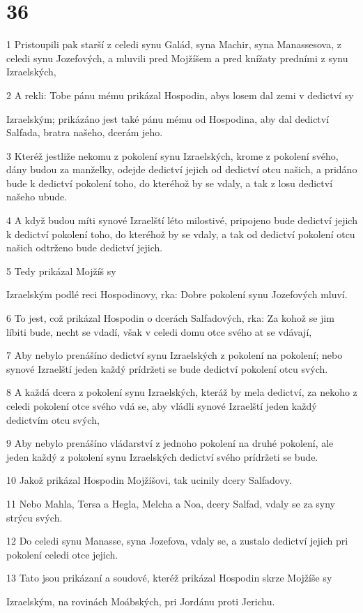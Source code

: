 \chapter{36}

\par 1 Pristoupili pak starší z celedi synu Galád, syna Machir, syna Manassesova, z celedi synu Jozefových, a mluvili pred Mojžíšem a pred knížaty predními z synu Izraelských,
\par 2 A rekli: Tobe pánu mému prikázal Hospodin, abys losem dal zemi v dedictví sy\par Izraelským; prikázáno jest také pánu mému od Hospodina, aby dal dedictví Salfada, bratra našeho, dcerám jeho.
\par 3 Kteréž jestliže nekomu z pokolení synu Izraelských, krome z pokolení svého, dány budou za manželky, odejde dedictví jejich od dedictví otcu našich, a pridáno bude k dedictví pokolení toho, do kteréhož by se vdaly, a tak z losu dedictví našeho ubude.
\par 4 A když budou míti synové Izraelští léto milostivé, pripojeno bude dedictví jejich k dedictví pokolení toho, do kteréhož by se vdaly, a tak od dedictví pokolení otcu našich odtrženo bude dedictví jejich.
\par 5 Tedy prikázal Mojžíš sy\par Izraelským podlé reci Hospodinovy, rka: Dobre pokolení synu Jozefových mluví.
\par 6 To jest, což prikázal Hospodin o dcerách Salfadových, rka: Za kohož se jim líbiti bude, necht se vdadí, však v celedi domu otce svého at se vdávají,
\par 7 Aby nebylo prenášíno dedictví synu Izraelských z pokolení na pokolení; nebo synové Izraelští jeden každý prídržeti se bude dedictví pokolení otcu svých.
\par 8 A každá dcera z pokolení synu Izraelských, kteráž by mela dedictví, za nekoho z celedi pokolení otce svého vdá se, aby vládli synové Izraelští jeden každý dedictvím otcu svých,
\par 9 Aby nebylo prenášíno vládarství z jednoho pokolení na druhé pokolení, ale jeden každý z pokolení synu Izraelských dedictví svého prídržeti se bude.
\par 10 Jakož prikázal Hospodin Mojžíšovi, tak ucinily dcery Salfadovy.
\par 11 Nebo Mahla, Tersa a Hegla, Melcha a Noa, dcery Salfad, vdaly se za syny strýcu svých.
\par 12 Do celedi synu Manasse, syna Jozefova, vdaly se, a zustalo dedictví jejich pri pokolení celedi otce jejich.
\par 13 Tato jsou prikázaní a soudové, kteréž prikázal Hospodin skrze Mojžíše sy\par Izraelským, na rovinách Moábských, pri Jordánu proti Jerichu.

